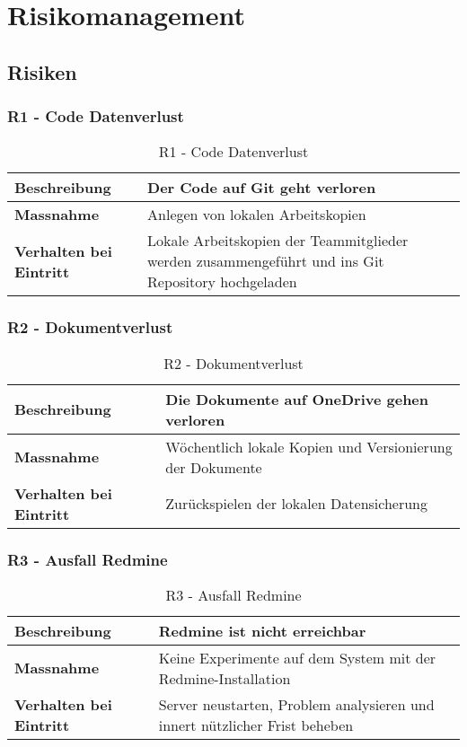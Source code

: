 \section{Risikomanagement}
\subsection{Risiken}
\subsubsection{R1 - Code Datenverlust}
\begin{table}[H]
    \centering
    \def\arraystretch{2}
    \begin{tabular}{| p{4.5cm} | p{11.5cm} |} \hline
        \textbf{Beschreibung} & Der Code auf Git geht verloren \\ \hline
        \textbf{Massnahme} & Anlegen von lokalen Arbeitskopien  \\ \hline
        \textbf{Verhalten bei Eintritt} & Lokale Arbeitskopien der Teammitglieder werden zusammengeführt und ins Git Repository hochgeladen \\ \hline 
    \end{tabular}
    \caption{R1 - Code Datenverlust}
\end{table}

\subsubsection{R2 - Dokumentverlust}
\begin{table}[H]
    \centering
    \def\arraystretch{2}
    \begin{tabular}{| p{4.5cm} | p{11.5cm} |} \hline
        \textbf{Beschreibung} & Die Dokumente auf OneDrive gehen verloren \\ \hline
        \textbf{Massnahme} & Wöchentlich lokale Kopien und Versionierung der Dokumente  \\ \hline
        \textbf{Verhalten bei Eintritt} & Zurückspielen der lokalen Datensicherung \\ \hline 
    \end{tabular}
    \caption{R2 - Dokumentverlust}
\end{table}

\subsubsection{R3 - Ausfall Redmine}
\begin{table}[H]
    \centering
    \def\arraystretch{2}
    \begin{tabular}{| p{4.5cm} | p{11.5cm} |} \hline
        \textbf{Beschreibung} & Redmine ist nicht erreichbar\\ \hline
        \textbf{Massnahme} & Keine Experimente auf dem System mit der Redmine-Installation  \\ \hline
        \textbf{Verhalten bei Eintritt} & Server neustarten, Problem analysieren und innert nützlicher Frist beheben \\ \hline 
    \end{tabular}
    \caption{R3 - Ausfall Redmine}
\end{table}


